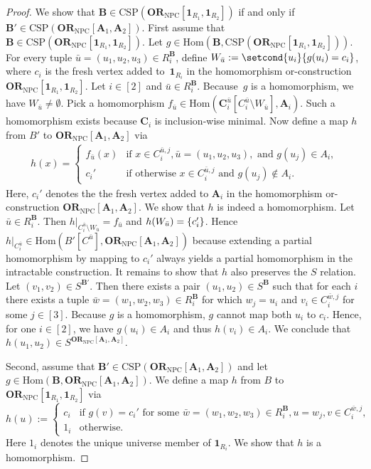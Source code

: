 \documentclass[a4paper,english, thm-restate]{lipics-v2021}
\DeclarePairedDelimiter\set{\lbrace}{\rbrace}
\newcommand{\tup}[1]{\bar{#1}}
\newcommand{\StructA}{\mathbf{A}}
\newcommand{\StructB}{\mathbf{B}}
\newcommand{\StructC}{\mathbf{C}}
\newcommand{\CSP}[1]{\mathrm{CSP}(#1)}
\newcommand{\restrict}[2]{#1|_{#2}}
\newcommand{\Hom}[2]{\mathrm{Hom}(#1,#2)}
\newcommand{\ORNPC}[1]{\mathbf{OR}_\text{NPC}[#1]}
\newcommand{\onestruc}[1]{\mathbf{1}_{#1}}
\begin{document}
\begin{proof}
		We show that $\StructB \in \CSP{\ORNPC{\onestruc{R_1}, \onestruc{R_2}}}$
		if and only if $\StructB' \in \CSP{\ORNPC{\StructA_1,\StructA_2}}$.
		First assume that $\StructB \in \CSP{\ORNPC{\onestruc{R_1}, \onestruc{R_2}}}$.
		Let $g \in \Hom{\StructB}{\CSP{\ORNPC{\onestruc{R_1}, \onestruc{R_2}}}}$.
		For every tuple $\tup{u} = (u_1, u_2, u_3) \in R_i^{\StructB}$,
		define $W_{\tup{u}} := \setcond{u_i}{g(u_i) = c_i}$,
		where $c_i$ is the fresh vertex added to~$\onestruc{R_i}$ in the homomorphism or-construction $\ORNPC{\onestruc{R_1}, \onestruc{R_2}}$.
		Let $i \in [2]$ and $\tup{u} \in R_i^{\StructB}$.
		Because~$g$ is a homomorphism, we have $W_{\tup{u}} \neq \emptyset$.
		Pick a homomorphism $f_{\tup{u}} \in \Hom{\StructC_i^{\tup{u}}[C_i^{\tup{u}} \setminus W_{\tup{u}}]}{\StructA_i}$.
		Such a homomorphism exists because $\StructC_i$ is inclusion-wise minimal.
		Now define a map $h$ from $B'$ to $\ORNPC{\StructA_1,\StructA_2}$ via
		\begin{align*}
			h(x) = \begin{cases}
				f_{\tup{u}}(x) & \text {if } x \in C_i^{\tup{u},j}, \tup{u}=(u_1,u_2,u_3), \text { and } g(u_j) \in A_i, \\
				c_i' & \text{if otherwise }x \in C_i^{\tup{u},j} \text { and } g(u_j) \notin A_i.
			\end{cases}
		\end{align*}
		Here,  $c_i'$ denotes the the fresh vertex added to $\StructA_i$ in the homomorphism or-construction $\ORNPC{\StructA_1, \StructA_2}$.
		We show that $h$ is indeed a homomorphism.
		Let $\tup{u} \in R_i^{\StructB}$.
		Then $\restrict{h}{C_i^{\tup{u}} \setminus W_{\tup{u}}} = f_{\tup{u}}$
		and $h(W_{\tup{u}}) = \set{c_i'}$.
		Hence $\restrict{h}{C_i^{\tup{u}}} \in \Hom{B'[C^{\tup{u}}]}{\ORNPC{\StructA_1,\StructA_2}}$
		because extending a partial homomorphism by mapping to $c_i'$ always yields a partial homomorphism in the intractable construction.
		It remains to show that $h$ also preserves the $S$ relation.
		Let $(v_1,v_2) \in S^{\StructB'}$.
		Then there exists a pair $(u_1, u_2) \in S^\StructB$
		such that for each $i$ there exists a tuple $\tup{w} =(w_1,w_2,w_3)\in R_i^\StructB$ 
		for which $w_j = u_i$ and $v_i \in C_i^{\tup{w},j}$ for some $j \in [3]$.
		Because $g$ is a homomorphism, $g$ cannot map both $u_i$ to $c_i$.
		Hence, for one $i \in [2]$, we have $g(u_i) \in A_i$ and thus
		$h(v_i) \in A_i$.
		We conclude that $h(u_1, u_2) \in S^{\ORNPC{\StructA_1,\StructA_2}}$.
		
		
		Second, assume that $\StructB' \in \CSP{\ORNPC{\StructA_1,\StructA_2}}$
		and let $g \in \Hom{\StructB}{\ORNPC{\StructA_1,\StructA_2}}$.
		We define a map $h$ from $B$ to $\ORNPC{\onestruc{R_1}, \onestruc{R_2}}$ via
		\[h(u) := \begin{cases}
			c_i & \text{if } g(v) = c_i'  \text{ for some }  \tup{w}=(w_1,w_2,w_3) \in R_i^{\StructB}, u = w_j, v \in C_{i}^{\tup{w},j},\\
			1_i & \text{otherwise.}
		\end{cases}\]
		Here $1_i$ denotes the unique universe member of $\onestruc{R_i}$.
		We show that $h$ is a homomorphism.
		

\end{proof}
\end{document}

